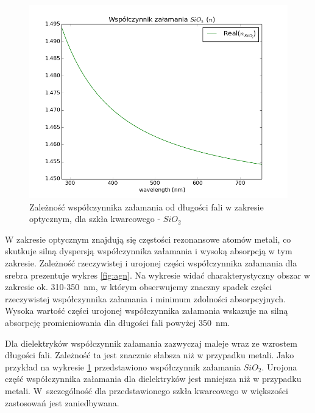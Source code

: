 \begin{figure}[tb]
	\includegraphics[width=\textwidth]{images/sio2n.png}
	\caption{Zależność współczynnika załamania od długości fali w zakresie optycznym, dla szkła kwarcowego -  $SiO_2$ \cite{MALITSON:65}   }
	\label{fig:sio2n}
\end{figure}
W zakresie optycznym znajdują się częstości rezonansowe atomów metali, co skutkuje silną dyspersją współczynnika załamania i wysoką absorpcją w tym zakresie. Zależność rzeczywistej i urojonej części współczynnika załamania  dla srebra prezentuje wykres \ref{fig:agn}. Na wykresie widać charakterystyczny obszar w zakresie ok. 310-350~nm, w którym obserwujemy znaczny spadek części rzeczywistej współczynnika załamania i minimum zdolności absorpcyjnych. Wysoka wartość części urojonej współczynnika załamania wskazuje na silną absorpcję promieniowania dla długości fali powyżej 350~nm.

Dla dielektryków współczynnik załamania zazwyczaj maleje wraz ze wzrostem długości fali. Zależność ta jest znacznie słabsza niż w przypadku metali. Jako przykład na wykresie \ref{fig:sio2n} przedstawiono współczynnik załamania $SiO_2$. Urojona część współczynnika załamania dla dielektryków jest mniejsza niż w przypadku metali. W~szczególność dla przedstawionego szkła kwarcowego w większości zastosowań jest zaniedbywana.

